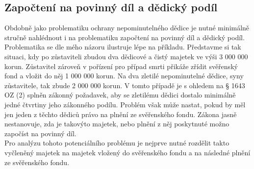 \documentclass{article}
\begin{document}




\subsection{Započtení na povinný díl a dědický podíl}

Obdobně jako problematiku ochrany nepominutelného dědice je nutné minimálně stručně nahlédnout i na problematiku započtení na povinný díl a dědický podíl.\\

Problematika se dle mého názoru ilustruje lépe na příkladu. Představme si tak situaci, kdy po zůstaviteli zbudou dva dědicové a čistý majetek ve výši 3 000 000 korun. Zůstavitel zároveň v pořízení pro případ smrti přikáže zřídit svěřenský fond a vložit do něj 1 000 000 korun. Na dva zletilé nepominutelné dědice, syny zůstavitele, tak zbude 2 000 000 korun. V tomto případě je s ohledem na § 1643 OZ (2) splněn zákonný požadavek, aby se zletilému dědici dostalo minimálně jedné čtvrtiny jeho zákonného podílu. Problém však může nastat, pokud by měl jen jeden z těchto dědiců právo na plnění ze svěřenského fondu. Zákona jasně nestanovuje, zda je takovýto majetek, nebo plnění z něj poskytnuté možno započíst na povinný díl.\\

Pro analýzu tohoto potenciálního problému je nejprve nutné rozdělit takto vyčleněný majetek na majetek vložený do svěřenského fondu a na následné plnění ze svěřenského fondu.\\
\end{document}
